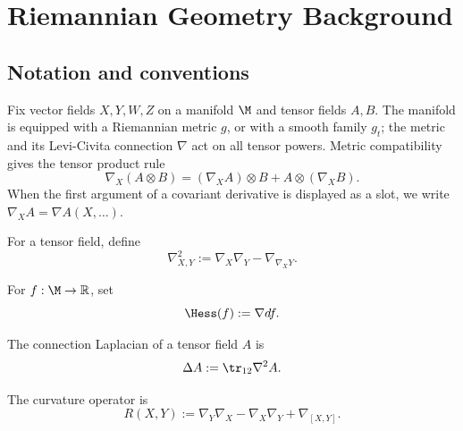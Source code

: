 \chapter{Riemannian Geometry Background}

\section{Notation and conventions}

Fix vector fields $X,Y,W,Z$ on a manifold $\M$ and tensor fields $A,B$. The
manifold is equipped with a Riemannian metric $g$, or with a smooth family
$g_t$; the metric and its Levi-Civita connection $\nabla$ act on all tensor
powers. Metric compatibility gives the tensor product rule
\[
\nabla_X(A\otimes B)=(\nabla_XA)\otimes B+A\otimes(\nabla_XB).
\]
When the first argument of a covariant derivative is displayed as a slot, we
write $\nabla_XA=\nabla A(X,\ldots)$.

\begin{definition}
\label{topping:notn-second-covariant-derivative}
\leanok
For a tensor field, define
\[
\nabla^2_{X,Y}:=\nabla_X\nabla_Y-\nabla_{\nabla_XY}.
\]
\end{definition}

\begin{definition}[Hessian]
\label{topping:notn-hessian}
\leanok
For $f:\M\to\mathbb{R}$, set
\[
\Hess(f):=\nabla df.
\]
\end{definition}

\begin{definition}
\label{topping:notn-rough-laplacian}
\leanok
The connection Laplacian of a tensor field $A$ is
\[
\Delta A:=\tr_{12}\nabla^2A.
\]
\end{definition}

\begin{definition}
\label{topping:notn-curvature-operator}
\leanok
The curvature operator is
\[
R(X,Y):=\nabla_Y\nabla_X-\nabla_X\nabla_Y+\nabla_{[X,Y]}.
\]
\end{definition}

